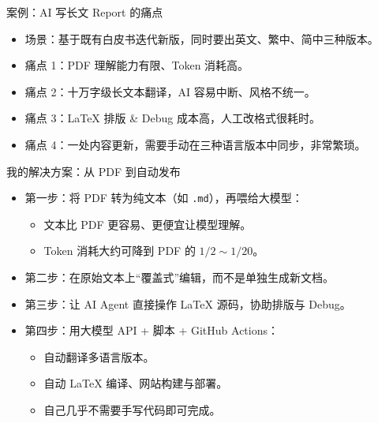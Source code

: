 \documentclass[aspectratio=169]{beamer}
\begin{document}
\begin{frame}{案例：AI 写长文 Report 的痛点}
  \begin{itemize}
    \item 场景：基于既有白皮书迭代新版，同时要出英文、繁中、简中三种版本。
    \item 痛点 1：PDF 理解能力有限、Token 消耗高。
    \item 痛点 2：十万字级长文本翻译，AI 容易中断、风格不统一。
    \item 痛点 3：LaTeX 排版 & Debug 成本高，人工改格式很耗时。
    \item 痛点 4：一处内容更新，需要手动在三种语言版本中同步，非常繁琐。
  \end{itemize}
\end{frame}

\begin{frame}{我的解决方案：从 PDF 到自动发布}
  \begin{itemize}
    \item 第一步：将 PDF 转为纯文本（如 \texttt{.md}），再喂给大模型：
      \begin{itemize}
        \item 文本比 PDF 更容易、更便宜让模型理解。
        \item Token 消耗大约可降到 PDF 的 $1/2 \sim 1/20$。
      \end{itemize}
    \item 第二步：在原始文本上“覆盖式”编辑，而不是单独生成新文档。
    \item 第三步：让 AI Agent 直接操作 LaTeX 源码，协助排版与 Debug。
    \item 第四步：用大模型 API + 脚本 + GitHub Actions：
      \begin{itemize}
        \item 自动翻译多语言版本。
        \item 自动 LaTeX 编译、网站构建与部署。
        \item 自己几乎不需要手写代码即可完成。
      \end{itemize}
  \end{itemize}
\end{frame}
\end{document}
